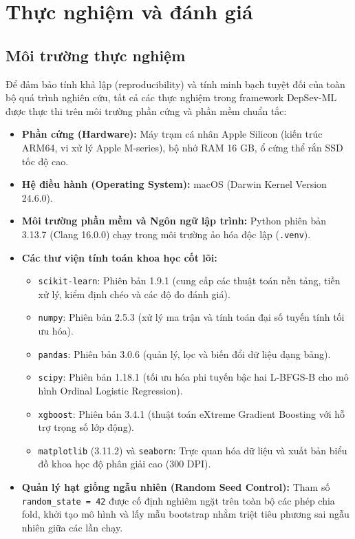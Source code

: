 \chapter{Thực nghiệm và đánh giá}
\label{ch:thuc-nghiem}

\section{Môi trường thực nghiệm}
\label{sec:moi-truong-thuc-nghiem}

Để đảm bảo tính khả lập (reproducibility) và tính minh bạch tuyệt đối của toàn bộ quá trình nghiên cứu, tất cả các thực nghiệm trong framework DepSev-ML được thực thi trên môi trường phần cứng và phần mềm chuẩn tắc:
\begin{itemize}
    \item \textbf{Phần cứng (Hardware):} Máy trạm cá nhân Apple Silicon (kiến trúc ARM64, vi xử lý Apple M-series), bộ nhớ RAM 16 GB, ổ cứng thể rắn SSD tốc độ cao.
    \item \textbf{Hệ điều hành (Operating System):} macOS (Darwin Kernel Version 24.6.0).
    \item \textbf{Môi trường phần mềm và Ngôn ngữ lập trình:} Python phiên bản 3.13.7 (Clang 16.0.0) chạy trong môi trường ảo hóa độc lập (\texttt{.venv}).
    \item \textbf{Các thư viện tính toán khoa học cốt lõi:}
    \begin{itemize}
        \item \texttt{scikit-learn}: Phiên bản 1.9.1 (cung cấp các thuật toán nền tảng, tiền xử lý, kiểm định chéo và các độ đo đánh giá).
        \item \texttt{numpy}: Phiên bản 2.5.3 (xử lý ma trận và tính toán đại số tuyến tính tối ưu hóa).
        \item \texttt{pandas}: Phiên bản 3.0.6 (quản lý, lọc và biến đổi dữ liệu dạng bảng).
        \item \texttt{scipy}: Phiên bản 1.18.1 (tối ưu hóa phi tuyến bậc hai L-BFGS-B cho mô hình Ordinal Logistic Regression).
        \item \texttt{xgboost}: Phiên bản 3.4.1 (thuật toán eXtreme Gradient Boosting với hỗ trợ trọng số lớp động).
        \item \texttt{matplotlib} (3.11.2) và \texttt{seaborn}: Trực quan hóa dữ liệu và xuất bản biểu đồ khoa học độ phân giải cao (300 DPI).
    \end{itemize}
    \item \textbf{Quản lý hạt giống ngẫu nhiên (Random Seed Control):} Tham số \texttt{random\_state = 42} được cố định nghiêm ngặt trên toàn bộ các phép chia fold, khởi tạo mô hình và lấy mẫu bootstrap nhằm triệt tiêu phương sai ngẫu nhiên giữa các lần chạy.
\end{itemize}


